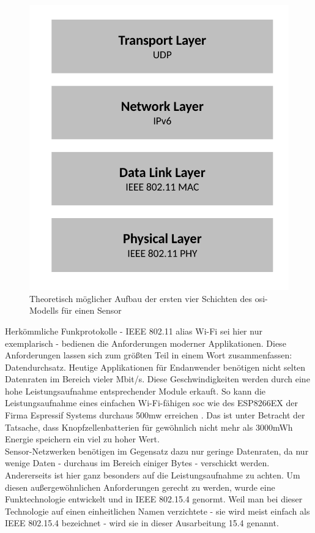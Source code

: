\begin{figure}
	\centering
	\includegraphics[width=\textwidth/2]{Grafiken-Alex/sensor-osi.pdf}
	\caption{Theoretisch möglicher Aufbau der ersten vier Schichten des \ac{osi}-Modells für einen Sensor}
	\label{sensor-osi}
\end{figure}
Herkömmliche Funkprotokolle - IEEE 802.11 alias Wi-Fi sei hier nur exemplarisch - bedienen die Anforderungen moderner Applikationen. Diese Anforderungen lassen sich zum größten Teil in einem Wort zusammenfassen: Datendurchsatz. Heutige Applikationen für Endanwender benötigen nicht selten Datenraten im Bereich vieler Mbit/s. Diese Geschwindigkeiten werden durch eine hohe Leistungsaufnahme entsprechender Module erkauft. So kann die Leistungsaufnahme eines einfachen Wi-Fi-fähigen \ac{soc} wie des ESP8266EX der Firma Espressif Systems durchaus 500\ac{m}\ac{w} erreichen \cite{esp8266}. Das ist unter Betracht der Tatsache, dass Knopfzellenbatterien für gewöhnlich nicht mehr als 3000mWh Energie speichern ein viel zu hoher Wert. \\
Sensor-Netzwerken benötigen im Gegensatz dazu nur geringe Datenraten, da nur wenige Daten - durchaus im Bereich einiger Bytes - verschickt werden. Andererseits ist hier ganz besonders auf die Leistungsaufnahme zu achten. Um diesen außergewöhnlichen Anforderungen gerecht zu werden, wurde eine Funktechnologie entwickelt und in IEEE 802.15.4 genormt. Weil man bei dieser Technologie auf einen einheitlichen Namen verzichtete - sie wird meist einfach als IEEE 802.15.4 bezeichnet - wird sie in dieser Ausarbeitung 15.4 genannt. \\
